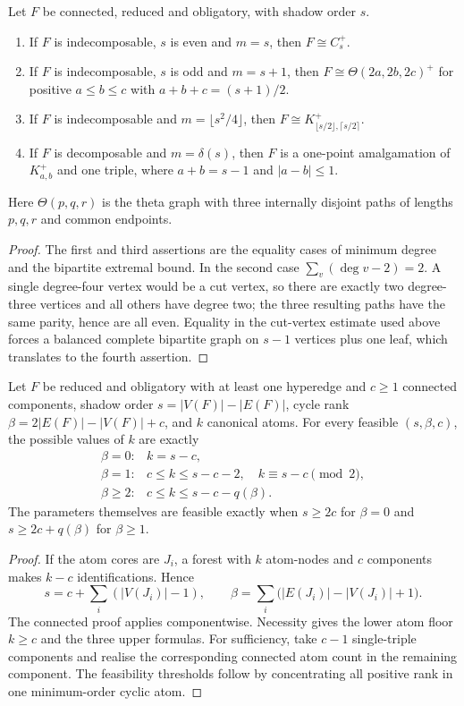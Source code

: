 \begin{corollary}
\label{corollary-structural-boundary-rigidity}
Let $F$ be connected, reduced and obligatory, with shadow order $s$.
\begin{enumerate}
\item If $F$ is indecomposable, $s$ is even and $m=s$, then
$F\cong C_s^+$.
\item If $F$ is indecomposable, $s$ is odd and $m=s+1$, then
$F\cong\Theta(2a,2b,2c)^+$ for positive $a\le b\le c$ with
$a+b+c=(s+1)/2$.
\item If $F$ is indecomposable and $m=\lfloor s^2/4\rfloor$, then
$F\cong K_{\lfloor s/2\rfloor,\lceil s/2\rceil}^+$.
\item If $F$ is decomposable and $m=\delta(s)$, then $F$ is a one-point
amalgamation of $K_{a,b}^+$ and one triple, where
$a+b=s-1$ and $|a-b|\le1$.
\end{enumerate}
Here $\Theta(p,q,r)$ is the theta graph with three internally disjoint paths
of lengths $p,q,r$ and common endpoints.
\end{corollary}
\begin{proof}
The first and third assertions are the equality cases of minimum degree and
the bipartite extremal bound.  In the second case
$\sum_v(\deg v-2)=2$.  A single degree-four vertex would be a cut vertex, so
there are exactly two degree-three vertices and all others have degree two;
the three resulting paths have the same parity, hence are all even.  Equality
in the cut-vertex estimate used above forces a balanced complete bipartite
graph on $s-1$ vertices plus one leaf, which translates to the fourth
assertion.
\end{proof}

\begin{proposition}
\label{proposition-componentwise-atom-count-spectrum}
Let $F$ be reduced and obligatory with at least one hyperedge and $c\ge1$
connected components, shadow order
$s=|V(F)|-|E(F)|$, cycle rank
$\beta=2|E(F)|-|V(F)|+c$, and $k$ canonical atoms.  For every feasible
$(s,\beta,c)$, the possible values of $k$ are exactly
\[
\begin{array}{ll}
\beta=0:
  & k=s-c,\\[1mm]
\beta=1:
  & c\le k\le s-c-2,\quad k\equiv s-c\pmod2,\\[1mm]
\beta\ge2:
  & c\le k\le s-c-q(\beta).
\end{array}
\tag{10.20}
\]
The parameters themselves are feasible exactly when $s\ge2c$ for $\beta=0$
and $s\ge2c+q(\beta)$ for $\beta\ge1$.
\end{proposition}
\begin{proof}
If the atom cores are $J_i$, a forest with $k$ atom-nodes and $c$ components
makes $k-c$ identifications.  Hence
\[
s=c+\sum_i(|V(J_i)|-1),
\qquad
\beta=\sum_i\bigl(|E(J_i)|-|V(J_i)|+1\bigr).
\]
The connected proof applies componentwise.  Necessity gives the lower atom
floor $k\ge c$ and the three upper formulas.  For sufficiency, take $c-1$
single-triple components and realise the corresponding connected atom count
in the remaining component.  The feasibility thresholds follow by
concentrating all positive rank in one minimum-order cyclic atom.
\end{proof}
